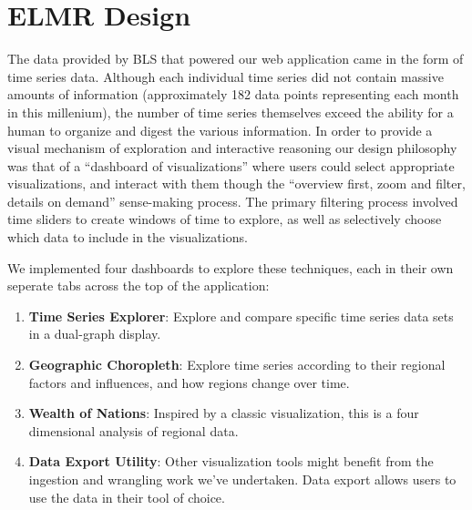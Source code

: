 \documentclass[journal]{IEEEtran}
\newcommand\Ben[1]{{\color{blue}#1}}		%
\begin{document}
\Ben{\section{ELMR Design}

The data provided by BLS that powered our web application came in the form of time series data. Although each individual time series did not contain massive amounts of information (approximately 182 data points representing each month in this millenium), the number of time series themselves exceed the ability for a human to organize and digest the various information. In order to provide a visual mechanism of exploration and interactive reasoning our design philosophy was that of a ``dashboard of visualizations'' where users could select appropriate visualizations, and interact with them though the ``overview first, zoom and filter, details on demand'' sense-making process. The primary filtering process involved time sliders to create windows of time to explore, as well as selectively choose which data to include in the visualizations.

We implemented four dashboards to explore these techniques, each in their own seperate tabs across the top of the application:

\begin{enumerate}
    \item \textbf{Time Series Explorer}: Explore and compare specific time series data sets in a dual-graph display.
    \item \textbf{Geographic Choropleth}: Explore time series according to their regional factors and influences, and how regions change over time.
    \item \textbf{Wealth of Nations}: Inspired by a classic visualization, this is a four dimensional analysis of regional data.
    \item \textbf{Data Export Utility}: Other visualization tools might benefit from the ingestion and wrangling work we've undertaken. Data export allows users to use the data in their tool of choice.
\end{enumerate}

}
\end{document}
